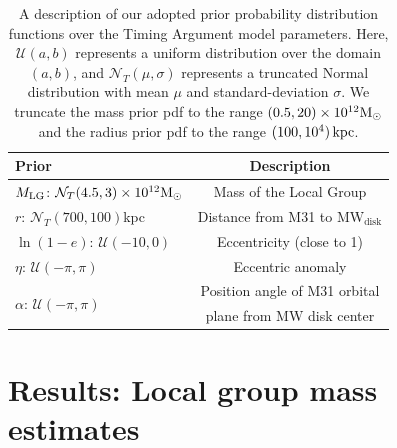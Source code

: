 \documentclass[twocolumn]{aastex631}
\newcommand{\kc}[1]{\textcolor{pink}{\textbf{#1}} }
\newcommand{\mlg}{\ensuremath{M_{\rm LG}}}
\newcommand{\mwdisk}{\ensuremath{\textrm{MW}_\textrm{disk}}}
\begin{document}
\begin{table}
  \centering
  \begin{tabular}{lc}
  \hline\hline
  Prior  & Description \\\hline
  \mlg: $\mathcal{N}_T(4.5,3)\times10^{12}\mathrm{M}_\odot$ & Mass of the Local Group\\
  $r$: $\mathcal{N}_T(700,100)$kpc & Distance from M31 to $\mwdisk$\\
  $\ln(1-e)$: $\mathcal{U}(-10,0)$ & Eccentricity (close to 1) \\
  $\eta$: $\mathcal{U}(-\pi, \pi)$ & Eccentric anomaly\\
  \multirow{2}{*}{$\alpha$: $\mathcal{U}(-\pi, \pi)$} & Position angle of M31 orbital\\
  & plane from MW disk center\\
  \hline\hline
  \end{tabular}
  \caption{\label{table:priors} A description of our adopted prior probability
  distribution functions over the Timing Argument model parameters.
  Here, $\mathcal{U}(a, b)$ represents a uniform distribution over the domain
  $(a, b)$, and $\mathcal{N}_T(\mu, \sigma)$ represents a truncated Normal
  distribution with mean $\mu$ and standard-deviation $\sigma$.
  We truncate the mass prior pdf to the range $(0.5, 20)\times10^{12} \mathrm{M}_\odot$ and
  the radius prior pdf to the range $(100, 10^{4})\,\mathrm{kpc}$.
  }
\end{table}


\section{Results: Local group mass estimates}
\label{sec:results}
\end{document}

